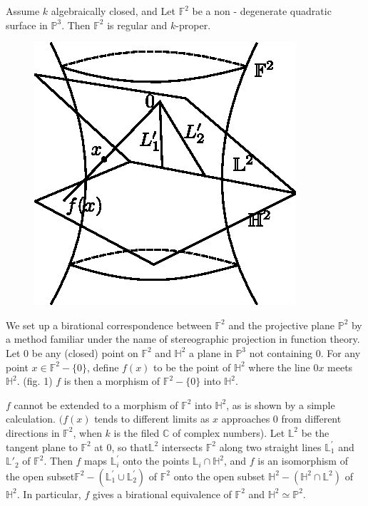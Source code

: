 \begin{exam}\label{chap1:exam2}%
  Assume $k$ algebraically closed, and Let $\mathbb{F}^2$ be a
  non - degenerate quadratic surface in $\mathbb{P}^3$. Then
  $\mathbb{F}^2$ is regular and $k$-proper. 

  \begin{figure}[H]
    \centerline{\includegraphics{vol37-figures/fig37-1.eps}}
  \end{figure}
  
  We set up a birational
  correspondence between $\mathbb{F}^2$ and the projective plane
  $\mathbb{P}^2$ by  a method familiar under the name of stereographic
  projection in function theory. Let $0$ be any (closed) point on
  $\mathbb{F}^2$ and $\mathbb{H}^2$ a plane in $\mathbb{P}^3$ not
  containing $0$. For any point $x \in \mathbb{F}^2-\{ 0 \}$, define
  $f(x)$ to be the point of $\mathbb{H}^2$ where the line $0 x$ meets
  $\mathbb{H}^2$. (fig. 1) $f$ is then a morphism of $\mathbb{F}^2 -
  \{ 0 \}$ into $\mathbb{H}^2$. 
\end{exam}

$f$ cannot be extended  to a morphism of $\mathbb{F}^2$ into
$\mathbb{H}^2$, as is shown by a simple calculation. $(f(x)$ tends to
different limits as $x$ approaches $0$ from different directions in
$\mathbb{F}^2$, when $k$ is the filed $\mathbb{C}$ of complex
numbers). Let $\mathbb{L}^2$  be the tangent plane to $\mathbb{F}^2$
at 0, so that\pageoriginale $\mathbb{L}^2$ intersects $\mathbb{F}^2$
along two straight lines $\mathbb{L}^{'}_1$ and $\mathbb{L}'_2$ of
$\mathbb{F}^2$. Then $f$ maps $\mathbb{L}^{'}_i$ onto the points
$\mathbb{L}_i \cap \mathbb{H}^2$, and $f$ is an isomorphism of the
open subset$\mathbb{F}^2 -(\mathbb{L}^{'}_1 \cup \mathbb{L}^{'}_2)$
of $\mathbb{F}^2$ onto the open subset $\mathbb{H}^2 -(\mathbb{H}^2
\cap \mathbb{L}^2)$ of $\mathbb{H}^2$. In particular, $f$ gives a
birational equivalence of $\mathbb{F}^2$ and $\mathbb{H}^2 \simeq
\mathbb{P}^2$. 
 
